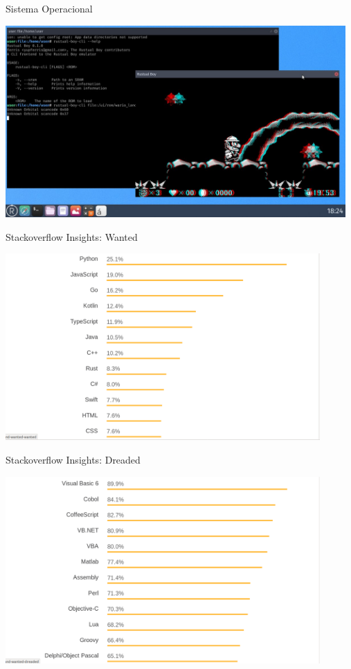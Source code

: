 \documentclass[aspectratio=169]{beamer}
\begin{document}
\begin{frame}{Sistema Operacional}
	\begin{center}
	\includegraphics[width=13.0cm]{imgs/redox.jpg}	
	\end{center}
\end{frame}

\begin{frame}{Stackoverflow Insights: Wanted}
	\begin{center}
		\includegraphics[width=12.0cm]{imgs/stackoverflow-wanted.png}	
	\end{center}
\end{frame}

\begin{frame}{Stackoverflow Insights: Dreaded}
	\begin{center}
		\includegraphics[width=12.0cm]{imgs/stackoverflow-dreaded.png}	
	\end{center}
\end{frame}
\end{document}
